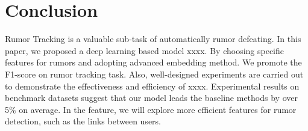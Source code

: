 \section{Conclusion}
\label{sec:conclusion}
Rumor Tracking is a valuable sub-task of automatically rumor defeating. In this paper, we proposed a deep learning based model xxxx.  By choosing specific features for rumors and adopting advanced embedding method. We promote the F1-score on rumor tracking task. Also, well-designed experiments are carried out to demonstrate the effectiveness and efficiency of xxxx. Experimental results on benchmark datasets suggest that our model leads the baseline methods by over 5\% on average. In the feature, we will explore more efficient features for rumor detection, such as the links between users. 